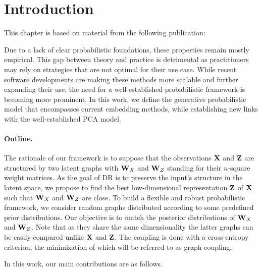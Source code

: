 \section{Introduction}\label{intro}


This chapter is based on material from the following publication:

\begin{center} 
\end{center}

Due to a lack of clear probabilistic foundations, these properties remain mostly empirical. This gap between theory and practice is detrimental as practitioners may rely on strategies that are not optimal for their use case.
While recent software developments are making these methods more scalable \cite{chan2018t,pezzotti2019gpgpu,linderman2019fast} and further expanding their use, the need for a well-established probabilistic framework is becoming more prominent.
In this work, we define the generative probabilistic model that encompasses current embedding methods, while establishing new links with the well-established PCA model.

\paragraph{Outline.} 
The rationale of our framework is to suppose that the observations $\mathbf{X}$ and $\mathbf{Z}$ are structured by two latent graphs with $\mathbf{W}_{X}$ and $\mathbf{W}_{Z}$ standing for their $n$-square weight matrices.
As the goal of DR is to preserve the input's structure in the latent space, we propose to find the best low-dimensional representation $\mathbf{Z}$ of $\mathbf{X}$ such that $\mathbf{W}_{X}$ and $\mathbf{W}_{Z}$ are close. To build a flexible and robust probabilistic framework, we consider random graphs distributed according to some predefined prior distributions. Our objective is to match the posterior distributions of $\mathbf{W}_{X}$ and $\mathbf{W}_{Z}$. Note that as they share the same dimensionality the latter graphs can be easily compared unlike $\mathbf{X}$ and $\mathbf{Z}$. The coupling is done with a cross-entropy criterion, the minimization of which will be referred to as graph coupling.

In this work, our main contributions are as follows.

